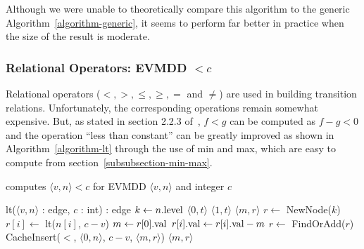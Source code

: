 \documentclass[nocover]             %
{NASA}                       %
\newcommand{\BLANK}{\STATE \vspace{-0.6em}}
\newcommand{\edge}[2]{\langle #1, #2 \rangle}
\newcommand{\val}[1]{#1{\rm .val}}
\newcommand{\level}[1]{#1{\rm .level}}
\begin{document}
Although we were unable to theoretically compare this algorithm to
the generic Algorithm~\vref{algorithm-generic}, it seems to perform
far better in practice when the size of the result is moderate.

\subsubsection{Relational Operators: EVMDD $< c$}

Relational operators ($<, >, \leq, \geq, =$ and $\neq$) are
used in building transition relations.
Unfortunately, the corresponding operations remain somewhat expensive.
But, as stated in section
2.2.3 of~\cite{Lai1996}, $f < g$ can be computed as $f-g < 0$ and
the operation ``less than constant'' can be greatly improved
as shown in Algorithm~\vref{algorithm-lt} through
the use of min and max, which are easy to compute from section~\vref{subsubsection-min-max}.
\begin{algorithm}[htbp]
  \caption{computes $\edge{v}{n} < c$ for EVMDD $\edge{v}{n}$ and integer $c$}
  \label{algorithm-lt}
  \begin{algorithmic}
    \item[lt($\edge{v}{n}$ : edge, $c$ : int) : edge]
    \STATE $k \gets \level{n}$
    \BLANK
    \STATE {}
      \RETURN $\edge{0}{t}$ 
    \ENDIF
      \RETURN $\edge{1}{t}$ 
    \ENDIF
    \BLANK
    \STATE {}
    \IF{CacheFind($<$, $\edge{0}{n}$, $c-v$, $\edge{m}{r}$)}
      \RETURN $\edge{m}{r}$
    \ENDIF
    \BLANK
    \STATE $r \gets$ NewNode($k$)
      \STATE $r[i] \gets$ lt($n[i]$, $c-v$)
    \ENDFOR
    \STATE $m \gets \val{r[0]}$
      \STATE $\val{r[i]} \gets \val{r[i]}-m$
    \ENDFOR
    \BLANK
    \STATE {}
    \STATE $r \gets$ FindOrAdd($r$)
    \BLANK
    \STATE {}
    \STATE CacheInsert($<$, $\edge{0}{n}$, $c-v$, $\edge{m}{r}$)
    \BLANK
    \RETURN $\edge{m}{r}$
  \end{algorithmic}
\end{algorithm}
\end{document}

